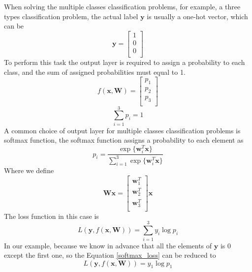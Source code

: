 When solving the multiple classes classification problems, for example, a three types classification problem, the actual label $\mathbf{y}$ is usually a one-hot vector, which can be
\begin{equation}
\mathbf{y} = \begin{bmatrix}
1\\
0\\
0\\
\end{bmatrix}
\end{equation}
To perform this task the output layer is required to assign a probability to each class, and the sum of assigned probabilities must equal to 1.
\begin{equation}
f(\mathbf{x},\mathbf{W}) =\begin{bmatrix}
p_{1} \\
p_{2} \\
p_{3} \\
\end{bmatrix}
\end{equation}
\begin{equation}
\sum_{i=1}^{3} p_{i} = 1
\end{equation}
A common choice of output layer for multiple classes classification problems is softmax function, the softmax function assigns a probability to each element as
\begin{equation}
p_{i} = \frac{\exp\{\mathbf{w}_{i}^{T} \mathbf{x}\}}{\sum_{i=1}^{3}\exp\{\mathbf{w}_{i}^{T} \mathbf{x}\}}
\end{equation}
Where we define
\begin{equation}
\mathbf{Wx} = \begin{bmatrix}
\mathbf{w}_{1}^{T}\\
\mathbf{w}_{2}^{T}\\
\mathbf{w}_{3}^{T}\\
\end{bmatrix} \mathbf{x}
\end{equation}
The loss function in this case is  
\begin{equation}\label{softmax_loss}
L(\mathbf{y},f(\mathbf{x},\mathbf{W})) = \sum_{i=1}^{3}y_{i}\log p_{i}
\end{equation}
In our example, because we know in advance that all the elements of $\mathbf{y}$ is 0 except the first one, so the Equation \ref{softmax_loss} can be reduced to 
\begin{equation}
L(\mathbf{y},f(\mathbf{x},\mathbf{W})) = y_{1}\log p_{1}
\end{equation}
